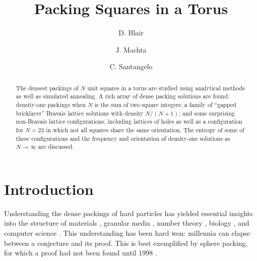 \documentclass[preprint,aps]{revtex4}
\begin{document}
\title{Packing Squares in a Torus}

\author{D. Blair}

\author{J. Machta}

\author{C. Santangelo}

\begin{abstract}
The densest packings of $N$ unit squares in a torus are studied using analytical methods as well as simulated annealing.  A rich array of dense packing solutions are found: density-one packings when $N$ is the sum of two square integers; a family of ``gapped bricklayer'' Bravais lattice solutions with density $N/(N+1)$; and some surprising non-Bravais lattice configurations, including lattices of holes as well as a configuration for $N=23$ in which not all squares share the same orientation.  The entropy of some of these configurations and the frequency and orientation of density-one solutions as $N \rightarrow \infty$ are discussed.

\end{abstract} 
\maketitle

%
\section{Introduction}

Understanding the dense packings of hard particles has yielded essential insights into the structure of materials \cite{Bernal1964,Zallen1983,Torquato2002,Chaikin2000}, granular media \cite{Torquato2002,Mehta1994}, number theory \cite{COHNa,Conway1999}, biology 
\cite{Gevertz2008,Purohit2003}, and computer science \cite{Johnson1974,Lodi2002}. This understanding has been hard won: millennia can elapse between a conjecture and its proof. This is best exemplified by sphere packing, for which a proof had not been found until 1998 \cite{HALESa}.
\end{document}
